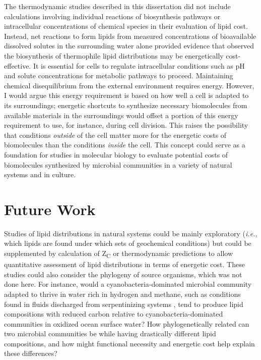 The thermodynamic studies described in this dissertation did not include calculations involving individual reactions of biosynthesis pathways or intracellular concentrations of chemical species in their evaluation of lipid cost. Instead, net reactions to form lipids from measured concentrations of bioavailable dissolved solutes in the surrounding water alone provided evidence that observed the biosynthesis of thermophile lipid distributions may be energetically cost-effective. It is essential for cells to regulate intracellular conditions such as pH and solute concentrations for metabolic pathways to proceed. Maintaining chemical disequilibrium from the external environment requires energy. However, I would argue this energy requirement is based on how well a cell is adapted to its surroundings; energetic shortcuts to synthesize necessary biomolecules from available materials in the surroundings would offset a portion of this energy requirement to use, for instance, during cell division. This raises the possibility that conditions \textit{outside} of the cell matter more for the energetic costs of biomolecules than the conditions \textit{inside} the cell. This concept could serve as a foundation for studies in molecular biology to evaluate potential costs of biomolecules synthesized by microbial communities in a variety of natural systems and in culture.

\section{Future Work}

Studies of lipid distributions in natural systems could be mainly exploratory (\textit{i.e.}, which lipids are found under which sets of geochemical conditions) but could be supplemented by calculation of Z\textsubscript{C} or thermodynamic predictions to allow quantitative assessment of lipid distributions in terms of energetic cost. These studies could also consider the phylogeny of source organisms, which was not done here. For instance, would a cyanobacteria-dominated microbial community adapted to thrive in water rich in hydrogen and methane, such as conditions found in fluids discharged from serpentinizing systems \citep{mccollom2009thermodynamic}, tend to produce lipid compositions with reduced carbon relative to cyanobacteria-dominated communities in oxidized ocean surface water? How phylogenetically related can two microbial communities be while having drastically different lipid compositions, and how might functional necessity and energetic cost help explain these differences?


